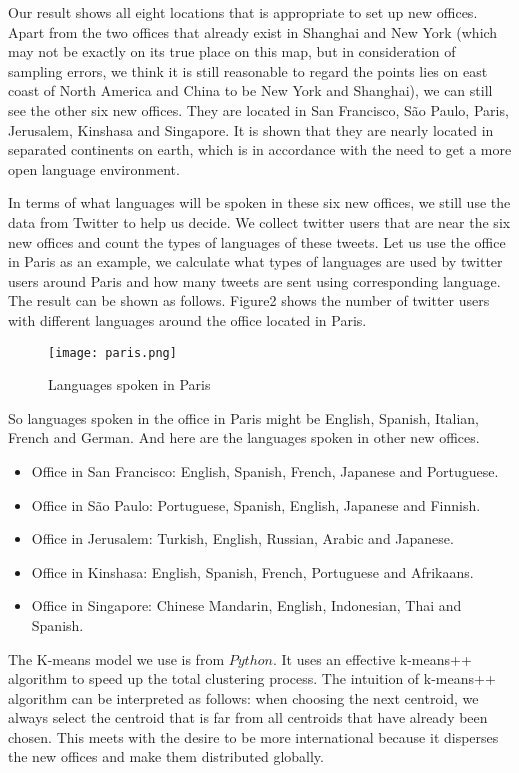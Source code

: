 \documentclass{mcmthesis}
\begin{document}
    \indent Our result shows all eight locations that is appropriate to set up new offices. Apart from the two offices that already exist in Shanghai and New York (which may not be exactly on its true place on this map, but in consideration of sampling errors, we think it is still reasonable to regard the points lies on east coast of North America and China to be New York and Shanghai), we can still see the other six new offices. They are located in San Francisco, São Paulo, Paris, Jerusalem, Kinshasa and Singapore. It is shown that they are nearly located in separated continents on earth, which is in accordance with the need to get a more open language environment.
  
    \indent In terms of what languages will be spoken in these six new offices, we still use the data from Twitter to help us decide. We collect twitter users that are near the six new offices and count the types of languages of these tweets. Let us use the office in Paris as an example, we calculate what types of languages are used by twitter users around Paris and how many tweets are sent using corresponding language. The result can be shown as follows. Figure2 shows the number of twitter users with different languages around the office located in Paris.
  
    \begin{figure}[h]
      \small
      \centering
      \texttt{[image: paris.png]}
      \caption{Languages spoken in Paris}
    \end{figure}
    \newpage
  
    \indent So languages spoken in the office in Paris might be English, Spanish, Italian, French and German. And here are the languages spoken in other new offices.
    \begin{itemize}
      \item Office in San Francisco: English, Spanish, French, Japanese and Portuguese.
      \item Office in São Paulo: Portuguese, Spanish, English, Japanese and Finnish.
      \item Office in Jerusalem: Turkish, English, Russian, Arabic and Japanese.
      \item Office in Kinshasa: English, Spanish, French, Portuguese and Afrikaans.
      \item Office in Singapore: Chinese Mandarin, English, Indonesian, Thai and Spanish.
    \end{itemize} 
  
    \indent The K-means model we use is from $Python$. It uses an effective k-means++ algorithm to speed up the total clustering process. The intuition of k-means++ algorithm can be interpreted as follows: when choosing the next centroid, we always select the centroid that is far from all centroids that have already been chosen. This meets with the desire to be more international because it disperses the new offices and make them distributed globally. 
  
\end{document}
